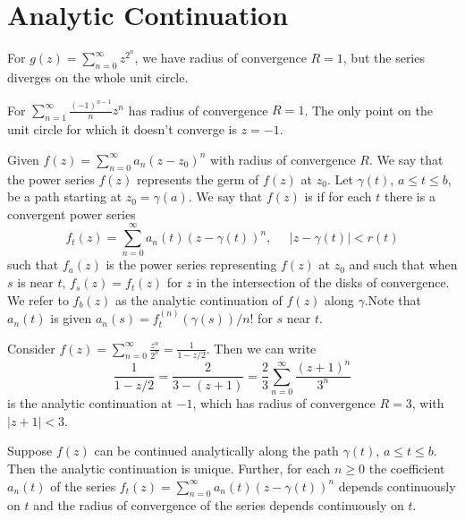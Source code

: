 \section{Analytic Continuation}

\begin{example}
    For $g(z) = \sum_{n=0}^{\infty}z^{2^n}$, we have radius of convergence $R = 1$, but the series diverges on the whole unit circle.
\end{example}

\begin{example}
    For $\sum_{n=1}^{\infty}\frac{(-1)^{n-1}}{n}z^n$ has radius of convergence $R = 1$. The only point on the unit circle for which it doesn't converge is $z = -1$.
\end{example}



Given $f(z) = \sum_{n=0}^{\infty}a_n(z-z_0)^n$ with radius of convergence $R$. We say that the power series $f(z)$ represents the germ of $f(z)$ at $z_0$. Let $\gamma(t)$, $a \leq t \leq b$, be a path starting at $z_0 = \gamma(a)$. We say that $f(z)$ is  if for each $t$ there is a convergent power series \begin{equation*}
    f_t(z) = \sum_{n=0}^{\infty}a_n(t)(z-\gamma(t))^n,\;\;\;\;\;|z-\gamma(t)| < r(t)
\end{equation*}
such that $f_a(z)$ is the power series representing $f(z)$ at $z_0$ and such that when $s$ is near $t$, $f_s(z) = f_t(z)$ for $z$ in the intersection of the disks of convergence. We refer to $f_b(z)$ as the analytic continuation of $f(z)$ along $\gamma$.Note that $a_n(t)$ is given $a_n(s) = f_t^{(n)}(\gamma(s))/n!$ for $s$ near $t$.

\begin{example}
    Consider $f(z) = \sum_{n=0}^{\infty}\frac{z^n}{2^n} = \frac{1}{1-z/2}$. Then we can write \begin{equation*}
        \frac{1}{1-z/2} = \frac{2}{3-(z+1)} = \frac{2}{3}\sum_{n=0}^{\infty}\frac{(z+1)^n}{3^n}
    \end{equation*}
    is the analytic continuation at $-1$, which has radius of convergence $R = 3$, with $|z+1| < 3$.
\end{example}


\begin{theorem}
    Suppose $f(z)$ can be continued analytically along the path $\gamma(t)$, $a \leq t \leq b$. Then the analytic continuation is unique. Further, for each $n \geq 0$ the coefficient $a_n(t)$ of the series $f_t(z) = \sum_{n=0}^{\infty}a_n(t)(z-\gamma(t))^n$ depends continuously on $t$ and the radius of convergence of the series depends continuously on $t$.
\end{theorem}

